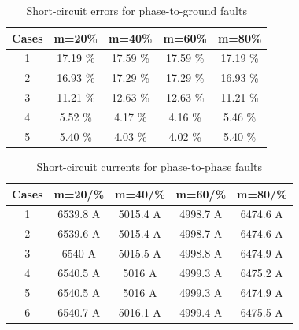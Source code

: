 \documentclass[conference]{IEEEtran}
\begin{document}
\begin{table}[!hbt]
	\renewcommand{\arraystretch}{1.3}
	\caption{Short-circuit errors for phase-to-ground faults}
	\label{table:AT_CC_E}
	\centering
	\begin{tabular}{|c|c|c|c|c|}
		\hline
		\textbf{Cases} & \textbf{m=20\%} & \textbf{m=40\%} & \textbf{m=60\%} & \textbf{m=80\%} \\ \hline
		1              & 17.19 \%         & 17.59 \%         & 17.59 \%         & 17.19 \%         \\ \hline
		2              & 16.93 \%         & 17.29 \%         & 17.29 \%         & 16.93 \%         \\ \hline
		3              & 11.21 \%         & 12.63 \%         & 12.63 \%         & 11.21 \%         \\ \hline
		4              & 5.52 \%          & 4.17 \%          & 4.16 \%          & 5.46 \%          \\ \hline
		5              & 5.40 \%          & 4.03 \%          & 4.02 \%          & 5.40 \%          \\ \hline
	\end{tabular}
\end{table}

\begin{table}[!hbt]
	\renewcommand{\arraystretch}{1.3}
	\caption{Short-circuit currents for phase-to-phase faults}
	\label{table:AB_CC}
	\centering
	\begin{tabular}{|c|c|c|c|c|}
		\hline
		\textbf{Cases} & \textbf{m=20/\%} & \textbf{m=40/\%} & \textbf{m=60/\%} & \textbf{m=80/\%} \\ \hline
		1              & 6539.8 A         & 5015.4 A         & 4998.7 A         & 6474.6 A         \\ \hline
		2              & 6539.6 A         & 5015.4 A         & 4998.7 A         & 6474.6 A         \\ \hline
		3              & 6540 A           & 5015.5 A         & 4998.8 A         & 6474.9 A         \\ \hline
		4              & 6540.5 A         & 5016 A           & 4999.3 A         & 6475.2 A         \\ \hline
		5              & 6540.5 A         & 5016 A           & 4999.3 A         & 6474.9 A         \\ \hline
		6              & 6540.7 A         & 5016.1 A         & 4999.4 A         & 6475.5 A         \\ \hline
	\end{tabular}
\end{table}
\end{document}
